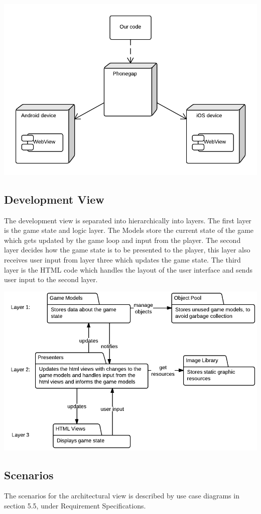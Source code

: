	\includegraphics[width=\textwidth]{pictures/deployment_diagram}

\subsection*{Development View}

	The development view is separated into hierarchically into layers. The first layer is the game state 
	and logic layer. The Models store the current state of the game which gets updated by the game loop 
	and input from the player. The second layer decides how the game state is to be presented to the 
	player, this layer also receives user input from layer three which updates the game state. The third 
	layer is the HTML code which handles the layout of the user interface and sends user input to the
	second layer.

	\includegraphics[scale=0.5]{pictures/development_view}

\subsection*{Scenarios}
	
	The scenarios for the architectural view is described by use case diagrams in section 5.5, 
	under Requirement Specifications.


